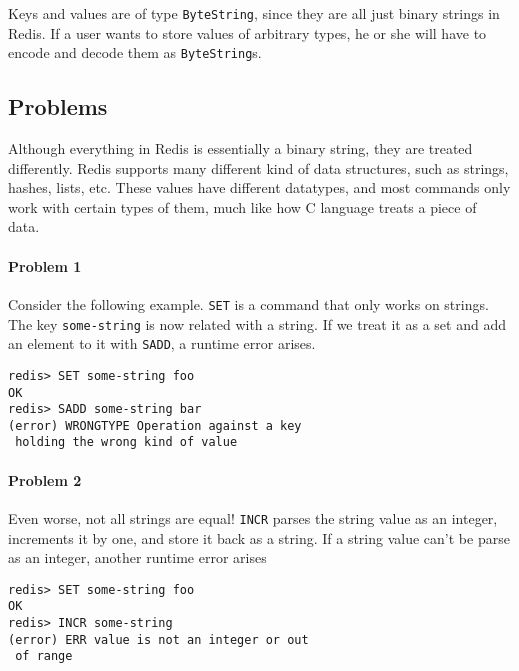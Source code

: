 \documentclass[pldi]{sigplanconf-pldi16}
\begin{document}
Keys and values are of type \texttt{ByteString}, since they are all
just binary strings in Redis. If a user wants to store values of
arbitrary types, he or she will have to encode and decode them as
 \texttt{ByteString}s.


\subsection{Problems}


Although everything in Redis is essentially a binary string, they are treated
differently. Redis supports many different kind of data structures, such as
strings, hashes, lists, etc. These values have different datatypes, and most
commands only work with certain types of them, much like how C language treats
a piece of data.

\paragraph{Problem 1} Consider the following example. \texttt{SET} is
a command that only works on strings. The key \texttt{some-string} is
now related with a string. If we treat it as a set and add an element to it with
\texttt{SADD}, a runtime error arises.

\begin{verbatim}
redis> SET some-string foo
OK
redis> SADD some-string bar
(error) WRONGTYPE Operation against a key
 holding the wrong kind of value
\end{verbatim}

\paragraph{Problem 2} Even worse, not all strings are equal!
\texttt{INCR} parses the string value as an integer, increments it by
one, and store it back as a string. If a string value can't be parse as an
integer, another runtime error arises

\begin{verbatim}
redis> SET some-string foo
OK
redis> INCR some-string
(error) ERR value is not an integer or out
 of range
\end{verbatim}
\end{document}
